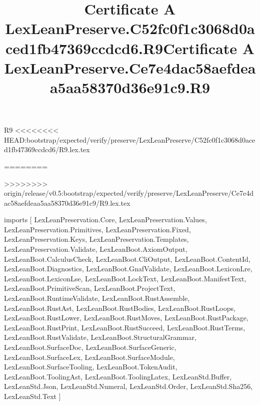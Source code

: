 \begin{lexlean}{R9}
<<<<<<<< HEAD:bootstrap/expected/verify/preserve/LexLeanPreserve/C52fc0f1c3068d0aced1fb47369ccdcd6/R9.lex.tex
\title{Certificate A LexLeanPreserve.C52fc0f1c3068d0aced1fb47369ccdcd6.R9}
========
\title{Certificate A LexLeanPreserve.Ce7e4dac58aefdeaa5aa58370d36e91c9.R9}
>>>>>>>> origin/release/v0.5:bootstrap/expected/verify/preserve/LexLeanPreserve/Ce7e4dac58aefdeaa5aa58370d36e91c9/R9.lex.tex
\begin{coremodule}
imports [
  LexLeanPreservation.Core,
  LexLeanPreservation.Values,
  LexLeanPreservation.Primitives,
  LexLeanPreservation.Fixed,
  LexLeanPreservation.Keys,
  LexLeanPreservation.Templates,
  LexLeanPreservation.Validate,
  LexLeanBoot.AxiomOutput,
  LexLeanBoot.CalculusCheck,
  LexLeanBoot.CliOutput,
  LexLeanBoot.ContentId,
  LexLeanBoot.Diagnostics,
  LexLeanBoot.GnafValidate,
  LexLeanBoot.LexiconLre,
  LexLeanBoot.LexiconLse,
  LexLeanBoot.LockText,
  LexLeanBoot.ManifestText,
  LexLeanBoot.PrimitiveScan,
  LexLeanBoot.ProjectText,
  LexLeanBoot.RuntimeValidate,
  LexLeanBoot.RustAssemble,
  LexLeanBoot.RustAst,
  LexLeanBoot.RustBodies,
  LexLeanBoot.RustLoops,
  LexLeanBoot.RustLower,
  LexLeanBoot.RustMoves,
  LexLeanBoot.RustPackage,
  LexLeanBoot.RustPrint,
  LexLeanBoot.RustSucceed,
  LexLeanBoot.RustTerms,
  LexLeanBoot.RustValidate,
  LexLeanBoot.StructuralGrammar,
  LexLeanBoot.SurfaceDoc,
  LexLeanBoot.SurfaceGeneric,
  LexLeanBoot.SurfaceLex,
  LexLeanBoot.SurfaceModule,
  LexLeanBoot.SurfaceTooling,
  LexLeanBoot.TokenAudit,
  LexLeanBoot.ToolingAst,
  LexLeanBoot.ToolingLatex,
  LexLeanStd.Buffer,
  LexLeanStd.Json,
  LexLeanStd.Numeral,
  LexLeanStd.Order,
  LexLeanStd.Sha256,
  LexLeanStd.Text
]


\end{coremodule}
\end{lexlean}
